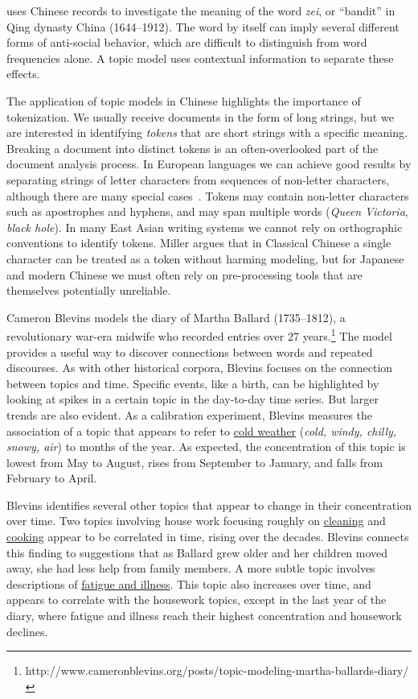 \citet{miller-13} uses Chinese records to investigate the meaning of
the word {\em zei}, or ``bandit'' in Qing dynasty China (1644--1912). The word by
itself can imply several different forms of anti-social behavior,
which are difficult to distinguish from word frequencies alone. A
topic model uses contextual information to separate these effects.

The application of topic models in Chinese highlights the importance of tokenization.
We usually receive documents in the form of long strings, but we are interested in identifying {\em tokens} that are short strings with a specific meaning.
Breaking a document into distinct tokens is an often-overlooked part of the document analysis process.
In European languages we can achieve good results by separating strings of letter characters from sequences of non-letter characters, although there are many special cases~\citep{Boyd-Graber-14}.
Tokens may contain non-letter characters such as apostrophes and hyphens, and may span multiple words ({\em Queen Victoria}, {\em black hole}).
In many East Asian writing systems we cannot rely on orthographic conventions to identify tokens.
Miller argues that in Classical Chinese a single character can be treated as a token without harming modeling, but for Japanese and modern Chinese we must often rely on pre-processing tools that are themselves potentially unreliable.


Cameron Blevins models the diary of Martha Ballard (1735--1812), a revolutionary war-era midwife who recorded entries over 27 years.\footnote{http://www.cameronblevins.org/posts/topic-modeling-martha-ballards-diary/} The model provides a useful way to discover connections between words and repeated discourses.
As with other historical corpora, Blevins focuses on the connection between topics and time.
Specific events, like a birth, can be highlighted by looking at spikes in a certain topic in the day-to-day time series.
But larger trends are also evident.
As a calibration experiment, Blevins measures the association of a topic that appears to refer to \underline{cold weather} ({\em cold, windy, chilly, snowy, air}) to months of the year.
As expected, the concentration of this topic is lowest from May to August, rises from September to January, and falls from February to April.

Blevins identifies several other topics that appear to change in their concentration over time.
Two topics involving house work focusing roughly on \underline{cleaning} and \underline{cooking} appear to be correlated in time, rising over the decades.
Blevins connects this finding to suggestions that as Ballard grew older and her children moved away, she had less help from family members.
A more subtle topic involves descriptions of \underline{fatigue and illness}.
This topic also increases over time, and appears to correlate with the housework topics, except in the last year of the diary, where fatigue and illness reach their highest concentration and housework declines.

